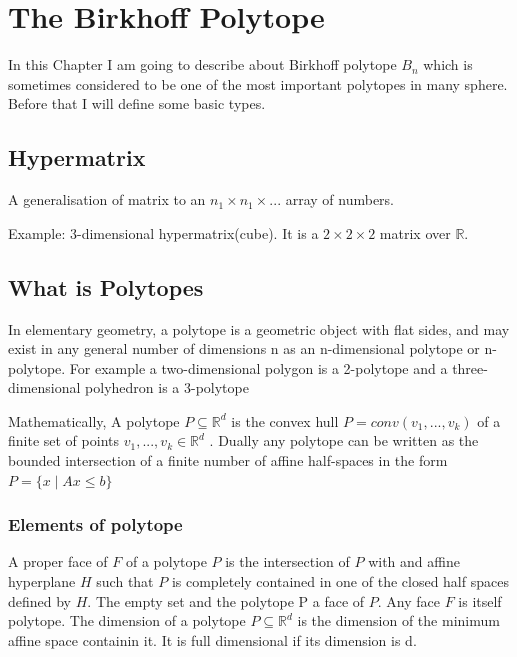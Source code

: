 
\chapter{The Birkhoff Polytope} %

\label{ChapterX} %



In this Chapter I am going to describe about Birkhoff polytope $B_n$ which is sometimes considered to be one of the most important polytopes in many sphere. Before that I will define some basic types.
\section{Hypermatrix}

A generalisation of matrix to an $n_1 \times n_1 \times ...$ array of numbers.

Example: 3-dimensional hypermatrix(cube). It is a $2 \times 2 \times 2$ matrix over $\mathbb{R}$.


\section{What is Polytopes}

In elementary geometry, a polytope is a geometric object with flat sides, and may exist in any general number of dimensions n as an n-dimensional polytope or n-polytope. For example a two-dimensional polygon is a 2-polytope and a three-dimensional polyhedron is a 3-polytope

Mathematically, A polytope $P\subseteq \mathbb{R}^d$ is the convex hull $P=conv(v_1,...,v_k)$ of a finite set of points $v_1,...,v_k \in \mathbb{R}^d$ . Dually any polytope can be written as the bounded intersection of a finite number of affine half-spaces in the form $P = \{ x\mid Ax \leq b \}$

\subsection{Elements of polytope}
A proper face of $F$ of a polytope $P$ is the intersection of $P$ with and affine hyperplane $H$ such that $P$ is completely contained in one of the closed half spaces defined by $H$. The empty set and the polytope P a face of $P$. Any face $F$ is itself  polytope. The dimension of a polytope $P \subseteq \mathbb{R}^d$ is the dimension of the minimum affine space containin it. It is full dimensional if its dimension is d.

